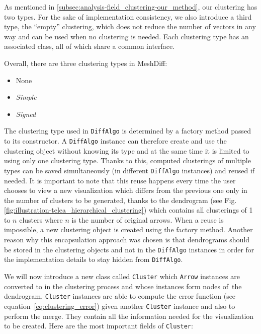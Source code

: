 As mentioned in \ref{subsec:analysis-field_clustering-our_method}, our clustering has two types. For the sake of implementation consistency, we also introduce a third type, the ``empty'' clustering, which does not reduce the number of vectors in any way and can be used when no clustering is needed. Each clustering type has an associated class, all of which share a common interface.

Overall, there are three clustering types in MeshDiff:

\begin{itemize}
\item None
\item {\it Simple}
\item {\it Signed}
\end{itemize}

The clustering type used in \verb+DiffAlgo+ is determined by a factory method passed to its constructor. A \verb+DiffAlgo+ instance can therefore create and use the clustering object without knowing its type and at the same time it is limited to using only one clustering type. Thanks to this, computed clusterings of multiple types can be saved simultaneously (in different \verb+DiffAlgo+ instances) and reused if needed. It is important to note that this reuse happens every time the user chooses to view a new visualization which differs from the previous one only in the number of clusters to be generated, thanks to the dendrogram (see Fig. \ref{fig:illustration-telea_hierarchical_clustering}) which contains all clusterings of 1 to \(n\) clusters where \(n\) is the number of original arrows. When a reuse is impossible, a new clustering object is created using the factory method. Another reason why this encapsulation approach was chosen is that dendrograms should be stored in the clustering objects and not in the \verb+DiffAlgo+ instances in order for the implementation details to stay hidden from \verb+DiffAlgo+.

We will now introduce a new class called \verb+Cluster+ which \verb+Arrow+ instances are converted to in the clustering process and whose instances form nodes of~the dendrogram. \verb+Cluster+ instances are able to compute the error function (see equation~\ref{eq:clustering_error}) given another \verb+Cluster+ instance and also to perform the merge. They contain all the information needed for the visualization to be created. Here are the most important fields of \verb+Cluster+:

